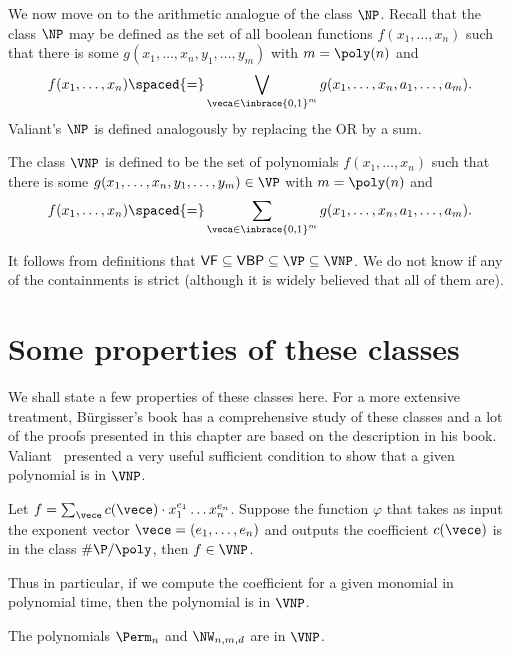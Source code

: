 We now move on to the arithmetic analogue of the class $\NP$.
Recall that the class $\NP$ may be defined as the set of all boolean functions $f(x_1,\dots, x_n)$ such that there is some $g(x_1,\dots, x_n, y_1,\dots, y_m)$ with $m = \poly(n)$ and
\[
f(x_1,\dots, x_n)\spaced{=} \bigvee_{\veca \in \inbrace{0,1}^m}  g(x_1,\dots, x_n, a_1,\dots, a_m).
\]
Valiant's $\NP$ is defined analogously by replacing the OR by a sum.

\begin{definition}[Valiant's $\NP$]\label{defn:vnp}
The class $\VNP$ is defined to be the set of polynomials $f(x_1,\dots, x_n)$ such that there is some $g(x_1,\dots, x_n, y_1,\dots, y_m) \in \VP$ with $m = \poly(n)$ and
\[
f(x_1,\dots, x_n)\spaced{=} \sum_{\veca \in \inbrace{0,1}^m}  g(x_1,\dots, x_n, a_1,\dots, a_m).
\]
\end{definition}

It follows from definitions that $\mathsf{VF} \subseteq \mathsf{VBP} \subseteq \VP \subseteq \VNP$.
We do not know if any of the containments is strict (although it is widely believed that all of them are).

\section{Some properties of these classes}

We shall state a few properties of these classes here.
For a more extensive treatment, B\"{u}rgisser's book \cite{bur00} has a comprehensive study of these classes and a lot of the proofs presented in this chapter are based on the description in his book. \\

Valiant~\cite{v79} presented a very useful sufficient condition to show that a given polynomial is in $\VNP$.

\begin{theorem} \label{thm:val-criterion}
Let $f = \sum_\vece c(\vece) \cdot x_1^{e_1}\dots x_n^{e_n}$.
Suppose the function $\varphi$ that takes as input the exponent vector $\vece = (e_1,\dots, e_n)$ and outputs the coefficient $c(\vece)$ is in the class $\#\P/\poly$, then $f \in \VNP$.
\end{theorem}

Thus in particular, if we compute the coefficient for a given monomial in polynomial time, then the polynomial is in $\VNP$.

\begin{corollary}
The polynomials $\Perm_n$ and $\NW_{n,m,d}$ are in $\VNP$.
\end{corollary}

